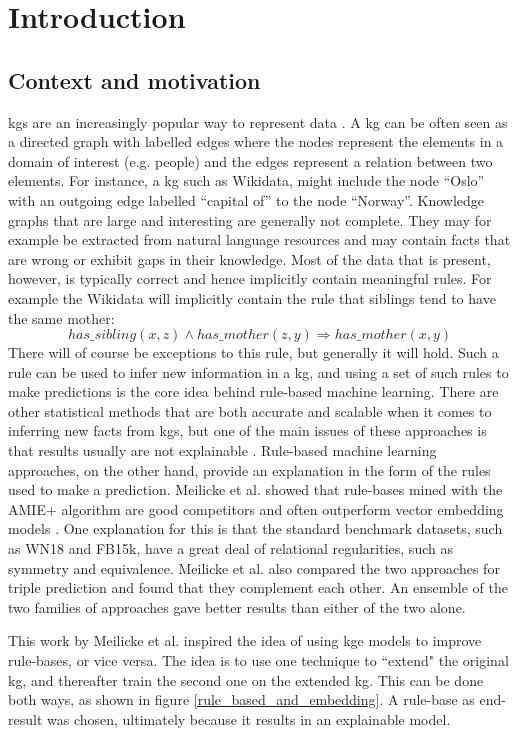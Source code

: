\chapter{Introduction}
\section{Context and motivation}
\Glspl{kg} are an increasingly popular way to represent data \cite{hogan2020knowledge}.
A \gls{kg} can be often seen as a directed graph with labelled edges where the nodes represent the elements in a domain of interest (e.g. people) and the edges represent a relation between two elements. For instance, a \gls{kg} such as Wikidata, might include the node ``Oslo'' with an outgoing edge labelled ``capital of'' to the node ``Norway''. Knowledge graphs that are large and interesting are generally not complete. They may for example be extracted from natural language resources and may contain facts that are wrong or exhibit gaps in their knowledge. Most of the data that is present, however, is typically correct and hence implicitly contain meaningful rules. For example the Wikidata will implicitly contain the rule that siblings tend to have the same mother:
\[has\_sibling(x, z) \wedge has\_mother(z, y) \Rightarrow has\_mother(x, y)\]
There will of course be exceptions to this rule, but generally it will hold. Such a rule can be used to infer new information in a \gls{kg}, and using a set of such rules to make predictions is the core idea behind rule-based machine learning. There are other statistical methods that are both accurate and scalable when it comes to inferring new facts from \glspl{kg}, but one of the main issues of these approaches is that results usually are not explainable \cite{bonatti2019knowledge}. Rule-based machine learning approaches, on the other hand, provide an explanation in the form of the rules used to make a prediction. Meilicke et al. showed that rule-bases mined with the AMIE+ algorithm are good competitors and often outperform vector embedding models \cite{ensemble}. One explanation for this is that the standard benchmark datasets, such as WN18 and FB15k,  have a great deal of relational regularities, such as symmetry and equivalence. Meilicke et al. also compared the two approaches for triple prediction and found that they complement each other. An ensemble of the two families of approaches gave better results than either of the two alone.

This work by Meilicke et al. inspired the idea of using \gls{kge} models to improve rule-bases, or vice versa. The idea is to use one technique to ``extend" the original \gls{kg}, and thereafter train the second one on the extended \gls{kg}. This can be done both ways, as shown in figure \ref{rule_based_and_embedding}. A rule-base as end-result was chosen, ultimately because it results in an explainable model. 

